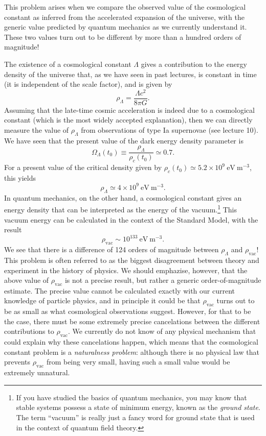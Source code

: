 This problem arises when we compare the observed value of the cosmological constant as inferred from the accelerated expansion of the universe, with the generic value predicted by quantum mechanics as we currently understand it. These two values turn out to be different by more than a hundred orders of magnitude!

The existence of a cosmological constant $\Lambda$ gives a contribution to the energy density of the universe that, as we have seen in past lectures, is constant in time (it is independent of the scale factor), and is given by
\begin{equation}
\rho_{\Lambda}=\frac{\Lambda c^2}{8\pi G}.
\end{equation}
Assuming that the late-time cosmic acceleration is indeed due to a cosmological constant (which is the most widely accepted explanation), then we can directly measure the value of $\rho_{\Lambda}$ from observations of type Ia supernovae (see lecture 10). We have seen that the present value of the dark energy density parameter is
\begin{equation}
\Omega_{\Lambda}(t_0)\equiv \frac{\rho_{\Lambda}}{\rho_c(t_0)}\simeq 0.7.
\end{equation}
For a present value of the critical density given by $\rho_c(t_0)\simeq 5.2\times10^{9}~\mathrm{eV~m^{-3}}$, this yields
\begin{equation}
\rho_{\Lambda}\simeq 4\times10^{9}~\mathrm{eV~m^{-3}}.
\end{equation}
In quantum mechanics, on the other hand, a cosmological constant gives an energy density that can be interpreted as the energy of the vacuum.\footnote{If you have studied the basics of quantum mechanics, you may know that stable systems possess a state of minimum energy, known as the {\it ground state}. The term ``vacuum'' is really just a fancy word for ground state that is used in the context of quantum field theory.} This vacuum energy can be calculated in the context of the Standard Model, with the result
\begin{equation} \label{eq:rho_vac}
\rho_{\mathrm{vac}}\sim 10^{133}~\mathrm{eV~m^{-3}}.
\end{equation}
We see that there is a difference of 124 orders of magnitude between $\rho_{\Lambda}$ and $\rho_{\mathrm{vac}}$! This problem is often referred to as the biggest disagreement between theory and experiment in the history of physics. We should emphazise, however, that the above value of $\rho_{\mathrm{vac}}$ is not a precise result, but rather a generic order-of-magnitude estimate. The precise value cannot be calculated exactly with our current knowledge of particle physics, and in principle it could be that $\rho_{\mathrm{vac}}$ turns out to be as small as what cosmological observations suggest. However, for that to be the case, there must be some extremely precise cancelations between the different contributions to $\rho_{\mathrm{vac}}$. We currently do not know of any physical mechanism that could explain why these cancelations happen, which means that the cosmological constant problem is a {\it naturalness problem}: although there is no physical law that prevents $\rho_{\mathrm{vac}}$ from being very small, having such a small value would be extremely unnatural.

